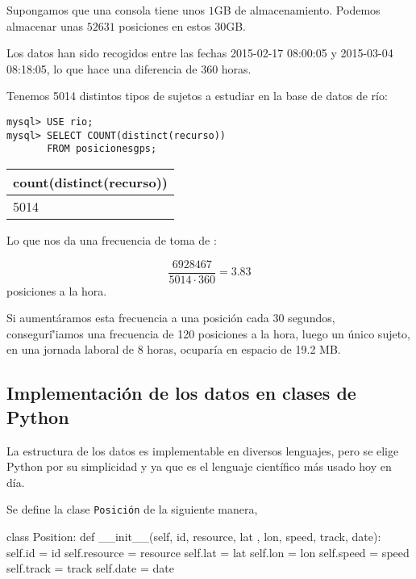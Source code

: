 \documentclass[a4paper, 12pt]{article}
\begin{document}
Supongamos que una consola tiene unos $1$GB de almacenamiento. Podemos almacenar unas $52631$ posiciones en estos 30GB. 

Los datos han sido recogidos entre las fechas 2015-02-17 08:00:05 y 2015-03-04 08:18:05, lo que hace una diferencia de 360 horas.

Tenemos 5014 distintos tipos de sujetos a estudiar en la base de datos de r\'io:

\begin{lstlisting}
mysql> USE rio;
mysql> SELECT COUNT(distinct(recurso)) 
	   FROM posicionesgps;
\end{lstlisting}

\begin{center}
 \begin{tabular}{|l|}
 \hline
	count(distinct(recurso)) \\
 \hline
	5014 \\
 \hline
 
 \end{tabular}
\end{center}


Lo que nos da una frecuencia de toma de :

$$ \frac{6928467}{5014 \cdot 360} = 3.83$$ posiciones a la hora.

Si aument\'aramos esta frecuencia a una posici\'on cada 30 segundos, conseguri\r'iamos una frecuencia de 120 posiciones a la hora, luego un \'unico sujeto, en una jornada laboral de 8 horas, ocupar\'ia en espacio de 19.2 MB. 

\subsection{Implementaci\'on de los datos en clases de Python}\label{sec:positionClass}

La estructura de los datos es implementable en diversos lenguajes, pero se elige Python por su simplicidad y ya que es el lenguaje cient\'ifico m\'as usado hoy en d\'ia.

Se define la clase \texttt{Posici\'on} de la siguiente manera,

\begin{python}
class Position:
    def __init__(self, id, resource, lat
    		    , lon, speed, track, date):
        self.id = id
        self.resource = resource
        self.lat = lat
        self.lon = lon
        self.speed = speed
        self.track = track
        self.date = date
\end{python}
\end{document}
